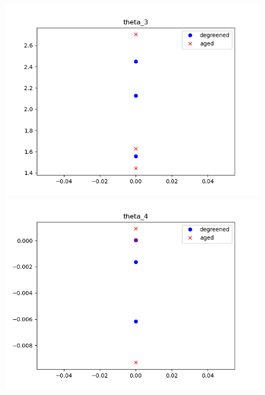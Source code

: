 \begin{figure}[H]
        \begin{minipage}{0.3\textwidth}
                \includegraphics[width = \textwidth]{./figs/figs_new_mdl/theta_3.png}
        \end{minipage}
        \begin{minipage}{0.3\textwidth}
                \includegraphics[width = \textwidth]{./figs/figs_new_mdl/theta_4.png}
        \end{minipage}
        \begin{minipage}{0.3\textwidth}

\end{minipage}
\end{figure}
